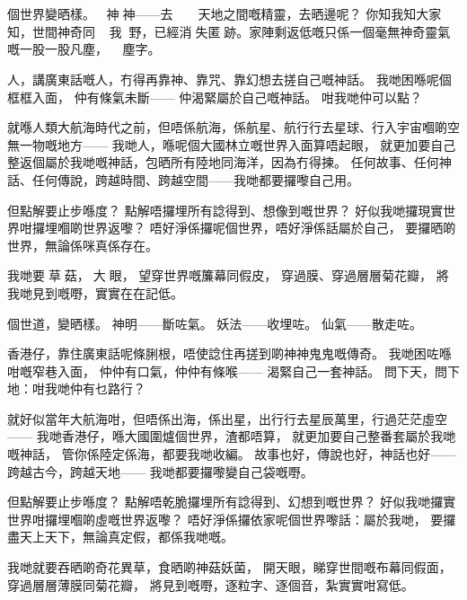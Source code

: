 \chapter{}
個世界變晒樣。
神神——去󱓺？
天地之間嘅精靈，去晒邊呢？
你知我知大家知，世間神奇同我󱝚野，已經消󱍚失匿󱍚跡。家陣剩返低嘅只係一個毫無神奇靈氣嘅一股一股凡塵， 塵字。

人，講廣東話嘅人，冇得再靠神、靠咒、靠幻想去搓自己嘅神話。
我哋困喺呢個框框入面，
仲有條氣未斷——
仲渴緊屬於自己嘅神話。
咁我哋仲可以點？

就喺人類大航海時代之前，但唔係航海，係航星、航行行去星球、行入宇宙嗰啲空無一物嘅地方——
我哋人，喺呢個大國林立嘅世界入面算唔起眼，
就更加要自己整返個屬於我哋嘅神話，包晒所有陸地同海洋，因為冇得揀。
任何故事、任何神話、任何傳說，跨越時間、跨越空間——我哋都要攞嚟自己用。

但點解要止步喺度？
點解唔攞埋所有諗得到、想像到嘅世界？
好似我哋攞現實世界咁攞埋嗰啲世界返嚟？
唔好淨係攞呢個世界，唔好淨係話屬於自己，
要攞晒啲世界，無論係咪真係存在。

我哋要󰩡草菇，󰖒大󰩡眼，
望穿世界嘅簾幕同假皮，
穿過膜、穿過層層菊花瓣，
將我哋見到嘅嘢，實實在在記低。



個世道，變晒樣。
神明——斷咗氣。
妖法——收埋咗。
仙氣——散走咗。

香港仔，靠住廣東話呢條脷根，唔使諗住再搓到啲神神鬼鬼嘅傳奇。
我哋困咗喺咁嘅窄巷入面，
仲仲有口氣，仲仲有條喉——
渴緊自己一套神話。
問下天，問下地：咁我哋仲有乜路行？

就好似當年大航海咁，但唔係出海，係出星，出行行去星辰萬里，行過茫茫虛空——
我哋香港仔，喺大國圍爐個世界，渣都唔算，
就更加要自己整番套屬於我哋嘅神話，
管你係陸定係海，都要我哋收編。
故事也好，傳說也好，神話也好——跨越古今，跨越天地——
我哋都要攞嚟變自己袋嘅嘢。

但點解要止步喺度？
點解唔乾脆攞埋所有諗得到、幻想到嘅世界？
好似我哋攞實世界咁攞埋嗰啲虛嘅世界返嚟？
唔好淨係攞依家呢個世界嚟話：屬於我哋，
要攞盡天上天下，無論真定假，都係我哋嘅。

我哋就要吞晒啲奇花異草，食晒啲神菇妖菌，
開天眼，睇穿世間嘅布幕同假面，
穿過層層薄膜同菊花瓣，
將見到嘅嘢，逐粒字、逐個音，紮實實咁寫低。